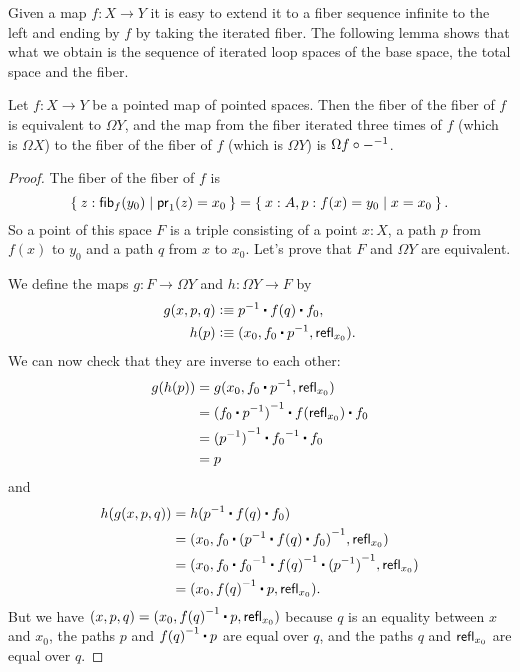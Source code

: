 Given a map $f:X\to Y$ it is easy to extend it to a fiber sequence infinite to
the left and ending by $f$ by taking the iterated fiber. The following lemma
shows that what we obtain is the sequence of iterated loop spaces of the base
space, the total space and the fiber.
%

\begin{lem}
  Let $f:X\to Y$ be a pointed map of pointed spaces. Then the fiber of the fiber
  of $f$ is equivalent to $\Omega Y$, and the map from the fiber iterated three
  times of $f$ (which is $\Omega X$) to the fiber of the fiber of $f$ (which is
  $\Omega Y$) is $\Omega f\circ\mathord{{-}^{-1}}$.
\end{lem}
\begin{proof}
  The fiber of the fiber of $f$ is
  \begin{equation*}
    \setof{z:\hfib{f}{y_0} | \proj{1}(z) = x_0} =
    \setof{x:A,p:f(x)=y_0 | x = x_0}.
  \end{equation*}
  So a point of this space $F$ is a triple consisting of a point $x:X$, a path
  $p$ from $f(x)$ to $y_0$ and a path $q$ from $x$ to $x_0$. Let’s prove that
  $F$ and $\Omega Y$ are equivalent.

  We define the maps $g : F \to \Omega Y$ and $h : \Omega Y \to F$ by
  \begin{align*}
    g(x,p,q) &\defeq \rev{p}\ct\ap{f}{q}\ct f_0,\\
    h(p) &\defeq (x_0, f_0\ct\rev{p}, \refl{x_0}).
  \end{align*}
  We can now check that they are inverse to each other:
  \begin{align*}
    g(h(p)) &= g(x_0, f_0\ct\rev{p}, \refl{x_0}) \\
    &= \rev{(f_0\ct\rev{p})}\ct\ap{f}{\refl{x_0}}\ct f_0 \\
    &= \rev{(\rev{p})}\ct\rev{f_0}\ct f_0 \\
    &= p
  \end{align*}
  and
  \begin{align*}
    h(g(x,p,q)) &= h(\rev{p}\ct\ap{f}{q}\ct f_0)\\
    &= (x_0, f_0\ct\rev{(\rev{p}\ct\ap{f}{q}\ct f_0)}, \refl{x_0}) \\
    &= (x_0, f_0\ct\rev{f_0}\ct\rev{\ap{f}{q}}\ct\rev{(\rev{p})}, \refl{x_0}) \\
    &= (x_0, \rev{\ap{f}{q}}\ct p, \refl{x_0}). \\
  \end{align*}
  But we have $(x,p,q)=(x_0, \rev{\ap{f}{q}}\ct p, \refl{x_0})$ because $q$ is
  an equality between $x$ and $x_0$, the paths $p$ and $\rev{\ap{f}{q}}\ct p$
  are equal over $q$, and the paths $q$ and $\mathsf{refl}_{x_0}$ are equal over $q$.


\end{proof}
